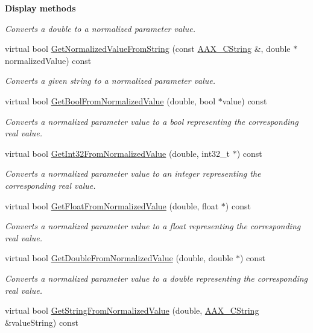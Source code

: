 \begin{Indent}{\bf Display methods}
\begin{DoxyCompactItemize}
\begin{DoxyCompactList}\small\item\em Converts a double to a normalized parameter value. \end{DoxyCompactList}\item 
virtual bool \hyperlink{a00040_a447211b704940ef670d97862f92f72f8}{Get\+Normalized\+Value\+From\+String} (const \hyperlink{a00042}{A\+A\+X\+\_\+\+C\+String} \&, double $\ast$normalized\+Value) const 
\begin{DoxyCompactList}\small\item\em Converts a given string to a normalized parameter value. \end{DoxyCompactList}\item 
virtual bool \hyperlink{a00040_af12b5c1cd63d345413969d9f9c0d8dcd}{Get\+Bool\+From\+Normalized\+Value} (double, bool $\ast$value) const 
\begin{DoxyCompactList}\small\item\em Converts a normalized parameter value to a bool representing the corresponding real value. \end{DoxyCompactList}\item 
virtual bool \hyperlink{a00040_aa60cf607804fd3b75dd107d9559da01c}{Get\+Int32\+From\+Normalized\+Value} (double, int32\+\_\+t $\ast$) const 
\begin{DoxyCompactList}\small\item\em Converts a normalized parameter value to an integer representing the corresponding real value. \end{DoxyCompactList}\item 
virtual bool \hyperlink{a00040_a665ed3f30e0c4cfecf4a93045e949f89}{Get\+Float\+From\+Normalized\+Value} (double, float $\ast$) const 
\begin{DoxyCompactList}\small\item\em Converts a normalized parameter value to a float representing the corresponding real value. \end{DoxyCompactList}\item 
virtual bool \hyperlink{a00040_ae854e097a8666af78c11637fb8afbc48}{Get\+Double\+From\+Normalized\+Value} (double, double $\ast$) const 
\begin{DoxyCompactList}\small\item\em Converts a normalized parameter value to a double representing the corresponding real value. \end{DoxyCompactList}\item 
virtual bool \hyperlink{a00040_aaf033eac1ab1c619304481b0e31fb3ce}{Get\+String\+From\+Normalized\+Value} (double, \hyperlink{a00042}{A\+A\+X\+\_\+\+C\+String} \&value\+String) const 

\end{DoxyCompactItemize}
\end{Indent}
